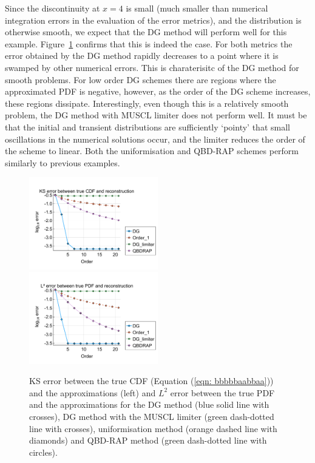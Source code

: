 \begin{example}
	Since the discontinuity at \(x=4\) is small (much smaller than numerical integration errors in the evaluation of the error metrics), and the distribution is otherwise smooth, we expect that the DG method will perform well for this example. Figure~\ref{fig: fun 6 wave} confirms that this is indeed the case. For both metrics the error obtained by the DG method rapidly decreases to a point where it is swamped by other numerical errors. This is charaterisitc of the DG method for smooth problems. For low order DG schemes there are regions where the approximated PDF is negative, however, as the order of the DG scheme increases, these regions dissipate. Interestingly, even though this is a relatively smooth problem, the DG method with MUSCL limiter does not perform well. It must be that the initial and transient distributions are sufficiently `pointy' that small oscillations in the numerical solutions occur, and the limiter reduces the order of the scheme to linear. Both the uniformisation and QBD-RAP schemes perform similarly to previous examples. 
	\begin{figure}
		\centering
		\includegraphics[width=0.5\textwidth,trim={0.75cm 0.8cm 0.25cm 1.25cm},clip]{chapter6/figs/wave/fun6/meshs_ks_error_formatted.pdf}%
		\includegraphics[width=0.5\textwidth,trim={0.75cm 0.8cm 0.25cm 1.25cm},clip]{chapter6/figs/wave/fun6/meshs_l2_pdf_error_formatted.pdf}
		\caption{KS error between the true CDF (Equation (\ref{eqn: bbbbbaabbaa})) and the approximations (left) and \(L^2\) error between the true PDF and the approximations for the DG method (blue solid line with crosses), DG method with the MUSCL limiter (green dash-dotted line with crosses), uniformisation method (orange dashed line with diamonds) and QBD-RAP method (green dash-dotted line with circles).} 
		\label{fig: fun 6 wave} 
	\end{figure}
\end{example}

